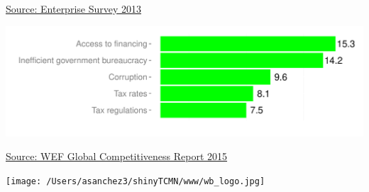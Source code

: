 \documentclass{article}\usepackage[]{graphicx}\usepackage[]{color}
\makeatletter
\def\maxwidth{ %
  \ifdim\Gin@nat@width>\linewidth
    \linewidth
  \else
    \Gin@nat@width
  \fi
}
\makeatother
\begin{document}
\begin{minipage}[b]{0.99\textwidth}
\begin{minipage}[b]{0.99\textwidth}
\begin{minipage}[c]{0.49\textwidth}
{}



      \hspace*{0.3cm} \raggedright\footnotesize{\href{https://www.enterprisesurveys.org/data}{Source: Enterprise Survey 2013}}
    \end{minipage}
    \begin{minipage}[c]{0.49\textwidth} %


{\centering \includegraphics[width=\maxwidth]{figure/top5constraintsWEF-1} 

}



    \hspace*{0.3cm} \raggedright\footnotesize{\href{http://www.weforum.org/reports/global-competitiveness-report-2015-2016}{Source: WEF Global Competitiveness Report 2015}}
    \end{minipage}
  \end{minipage}
\end{minipage}

\vspace{+8ex}
{\color{blue!50!white}\noindent\makebox[\linewidth]{\rule{18cm}{0.3pt}}} %

\vspace{+2ex}
\begin{minipage}[c]{0.33\textwidth}
  \hspace*{+0.3cm} \texttt{[image: /Users/asanchez3/shinyTCMN/www/wb\_logo.jpg]}
\end{minipage}
\begin{minipage}[c]{0.65\textwidth}
  \vspace*{-0.4cm}
\end{minipage}

\end{document}
